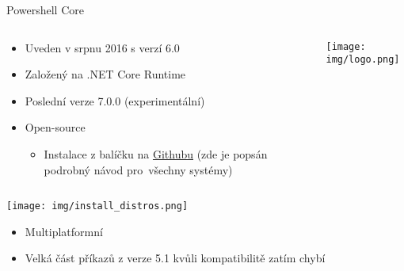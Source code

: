 \documentclass[main.tex]{subfiles}
\begin{document}
    \begin{frame}[allowframebreaks]{Powershell Core}
     \begin{columns}
       \begin{column}{0.5\textwidth}
      \begin{itemize}
     \item Uveden v srpnu 2016 s verzí 6.0
     \item Založený na .NET Core Runtime
     \item Poslední verze 7.0.0 (experimentální)
       \item Open-source
         \begin{itemize}
           \item Instalace z balíčku na \href{https://github.com/PowerShell/PowerShell}{Githubu} (zde je popsán podrobný návod pro~všechny systémy)
         \end{itemize}
     \end{itemize}
       \end{column}
       \begin{column}{0.5\textwidth}
         \begin{center}
          \texttt{[image: img/logo.png]}
         \end{center}
       \end{column}
     \end{columns}
         \begin{center}
\texttt{[image: img/install\_distros.png]}
         \end{center}
         \begin{itemize}
       \item Multiplatformní
       \item Velká část příkazů z verze 5.1 kvůli kompatibilitě zatím chybí
     \end{itemize}
\end{frame}
\end{document}
